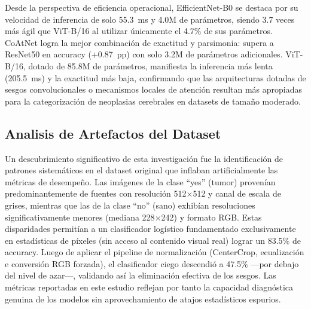 \begin{table}[H]
\centering
\caption{Comparacion de resultados. Todos los modelos entrenados desde cero con pipeline de normalizacion estricta (scratch + normalizado).}
\label{tab:comparative_summary}
\end{table}

Desde la perspectiva de eficiencia operacional, EfficientNet-B0 se destaca por su velocidad de inferencia de solo 55.3~ms y 4.0M de parámetros, siendo 3.7 veces más ágil que ViT-B/16 al utilizar únicamente el 4.7\% de sus parámetros. CoAtNet logra la mejor combinación de exactitud y parsimonia: supera a ResNet50 en accuracy (+0.87~pp) con solo 3.2M de parámetros adicionales. ViT-B/16, dotado de 85.8M de parámetros, manifiesta la inferencia más lenta (205.5~ms) y la exactitud más baja, confirmando que las arquitecturas dotadas de sesgos convolucionales o mecanismos locales de atención resultan más apropiadas para la categorización de neoplasias cerebrales en datasets de tamaño moderado.

\subsection{Analisis de Artefactos del Dataset}

Un descubrimiento significativo de esta investigación fue la identificación de patrones sistemáticos en el dataset original que inflaban artificialmente las métricas de desempeño. Las imágenes de la clase ``yes'' (tumor) provenían predominantemente de fuentes con resolución 512$\times$512 y canal de escala de grises, mientras que las de la clase ``no'' (sano) exhibían resoluciones significativamente menores (mediana 228$\times$242) y formato RGB. Estas disparidades permitían a un clasificador logístico fundamentado exclusivamente en estadísticas de píxeles (sin acceso al contenido visual real) lograr un 83.5\% de accuracy. Luego de aplicar el pipeline de normalización (CenterCrop, ecualización e conversión RGB forzada), el clasificador ciego descendió a 47.5\% —por debajo del nivel de azar—, validando así la eliminación efectiva de los sesgos. Las métricas reportadas en este estudio reflejan por tanto la capacidad diagnóstica genuina de los modelos sin aprovechamiento de atajos estadísticos espurios.
